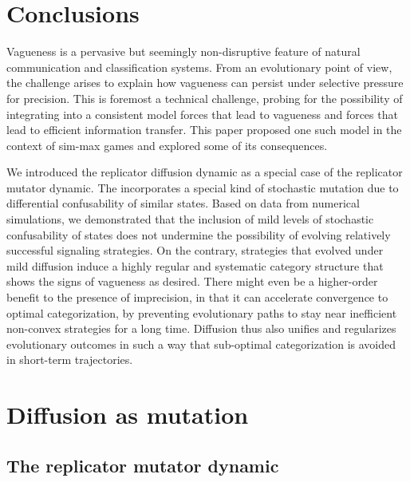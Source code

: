 \documentclass[fleqn,reqno,10pt]{article}
\newcommand{\rdd}{\acro{rdd}} %
\begin{document}

\section{Conclusions}
\label{sec:conclusions}

Vagueness is a pervasive but seemingly non-disruptive feature of
natural communication and classification systems. From an evolutionary
point of view, the challenge arises to explain how vagueness can
persist under selective pressure for precision. This is foremost a
technical challenge, probing for the possibility of integrating into a
consistent model forces that lead to vagueness and forces that lead
to efficient information transfer. This paper proposed one such model
in the context of sim-max games and explored some of its consequences.

We introduced the replicator diffusion dynamic as a special case of
the replicator mutator dynamic. The \rdd incorporates a special kind
of stochastic mutation due to differential confusability of similar
states. Based on data from numerical simulations, we demonstrated that
the inclusion of mild levels of stochastic confusability of states
does not undermine the possibility of evolving relatively successful
signaling strategies. On the contrary, strategies that evolved under
mild diffusion induce a highly regular and systematic category
structure that shows the signs of vagueness as desired. There might
even be a higher-order benefit to the presence of imprecision, in that
it can accelerate convergence to optimal categorization, by preventing
evolutionary paths to stay near inefficient non-convex strategies for
a long time. Diffusion thus also unifies and regularizes evolutionary
outcomes in such a way that sub-optimal categorization is avoided in
short-term trajectories.



\appendix

\section{Diffusion as mutation}
\label{sec:diffusion-as-special}

\subsection{The replicator mutator dynamic}
\label{sec:repl-mutat-dynam}
\end{document}
